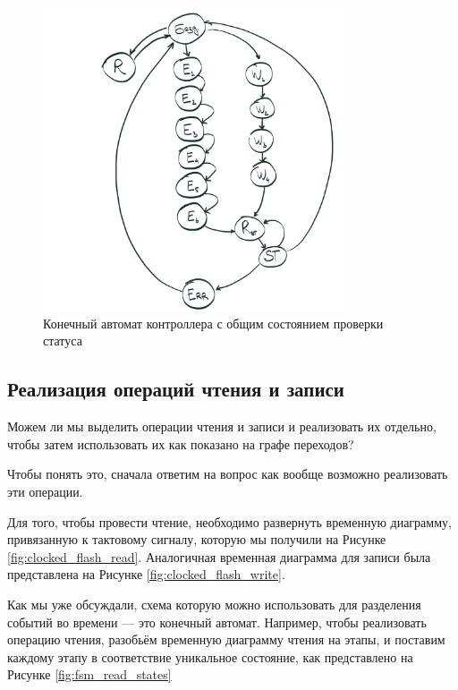 \begin{figure}[H]
\centering
% 
\includegraphics[width=0.8\textwidth]{./images/lab_6/fsm_common_status}
\caption{Конечный автомат контроллера  с общим состоянием проверки статуса}
\label{fig:fsm_common_status}
\end{figure}

\subsection{Реализация операций чтения и записи}
\par{Можем ли мы выделить операции чтения и записи и реализовать их отдельно, чтобы затем использовать их как показано на графе переходов?}
\par{Чтобы понять это, сначала ответим на вопрос как вообще возможно реализовать эти операции.}
\par{Для того, чтобы провести чтение, необходимо развернуть временную диаграмму, привязанную к тактовому сигналу, которую мы получили на Рисунке \ref{fig:clocked_flash_read}. Аналогичная временная диаграмма для записи была представлена на Рисунке \ref{fig:clocked_flash_write}.}
\par{Как мы уже обсуждали, схема которую можно использовать для разделения событий во времени --- это конечный автомат. Например, чтобы реализовать операцию чтения, разобьём временную диаграмму чтения на этапы, и поставим каждому этапу в соответствие уникальное состояние, как представлено на Рисунке \ref{fig:fsm_read_states}}

